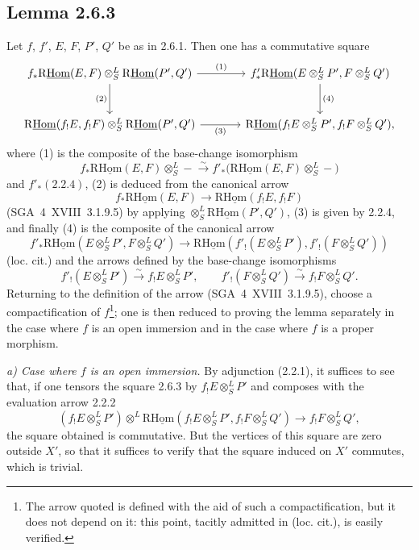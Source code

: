 \subsection*{Lemma 2.6.3}
Let $f$, $f'$, $E$, $F$, $P'$, $Q'$ be as in 2.6.1. Then one has a commutative square
\[
\begin{tikzcd}[column sep=large,row sep=large]
f_*\mathrm{R}\underline{\mathrm{Hom}}(E,F)\otimes^L_S\mathrm{R}\underline{\mathrm{Hom}}(P',Q') \arrow[r,"(1)"] \arrow[d,"(2)"'] & f'_*\mathrm{R}\underline{\mathrm{Hom}}(E\otimes^L_SP',F\otimes^L_SQ') \arrow[d,"(4)"]\\
\mathrm{R}\underline{\mathrm{Hom}}(f_!E,f_!F)\otimes^L_S\mathrm{R}\underline{\mathrm{Hom}}(P',Q') \arrow[r,"(3)"'] & \mathrm{R}\underline{\mathrm{Hom}}(f_!E\otimes^L_SP',f_!F\otimes^L_SQ'),
\end{tikzcd}
\]
where (1) is the composite of the base-change isomorphism
\[
f_*\mathrm{R}\underline{\mathrm{Hom}}(E,F)\otimes^L_S -\xrightarrow{\sim}f'_*\bigl(\mathrm{R}\underline{\mathrm{Hom}}(E,F)\otimes^L_S-\bigr)
\]
and $f'_*(2.2.4)$, (2) is deduced from the canonical arrow
\[
f_*\mathrm{R}\underline{\mathrm{Hom}}(E,F)\longrightarrow\mathrm{R}\underline{\mathrm{Hom}}(f_!E,f_!F)
\]
(SGA~4~XVIII~3.1.9.5) by applying $\otimes^L_S\mathrm{R}\underline{\mathrm{Hom}}(P',Q')$, (3) is given by 2.2.4, and finally (4) is the composite of the canonical arrow
\[
f'_*\mathrm{R}\underline{\mathrm{Hom}}(E\otimes^L_SP',F\otimes^L_SQ')
\longrightarrow
\mathrm{R}\underline{\mathrm{Hom}}(f'_!(E\otimes^L_SP'),f'_!(F\otimes^L_SQ'))
\]
(loc. cit.) and the arrows defined by the base-change isomorphisms
\[
f'_!(E\otimes^L_SP')\xrightarrow{\sim}f_!E\otimes^L_SP',
\qquad
f'_!(F\otimes^L_SQ')\xrightarrow{\sim}f_!F\otimes^L_SQ'.
\]
Returning to the definition of the arrow (SGA~4~XVIII~3.1.9.5), choose a compactification of $f$\footnote{The arrow quoted is defined with the aid of such a compactification, but it does not depend on it: this point, tacitly admitted in (loc. cit.), is easily verified.}; one is then reduced to proving the lemma separately in the case where $f$ is an open immersion and in the case where $f$ is a proper morphism.

\emph{a) Case where $f$ is an open immersion.} By adjunction (2.2.1), it suffices to see that, if one tensors the square 2.6.3 by $f_!E\otimes^L_SP'$ and composes with the evaluation arrow 2.2.2
\[
(f_!E\otimes^L_SP')\otimes^L\mathrm{R}\underline{\mathrm{Hom}}(f_!E\otimes^L_SP',f_!F\otimes^L_SQ')\longrightarrow f_!F\otimes^L_SQ',
\]
the square obtained is commutative. But the vertices of this square are zero outside $X'$, so that it suffices to verify that the square induced on $X'$ commutes, which is trivial.

